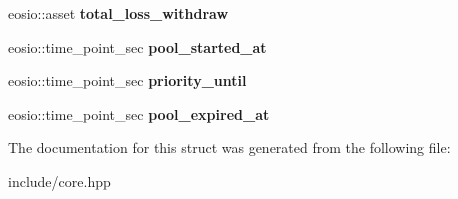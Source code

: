 \begin{DoxyCompactItemize}
eosio\+::asset {\bfseries total\+\_\+loss\+\_\+withdraw}
\item 
\mbox{\label{structeosio_1_1pool_a9432bde44a38b416c5317c488805523f}} 
eosio\+::time\+\_\+point\+\_\+sec {\bfseries pool\+\_\+started\+\_\+at}
\item 
\mbox{\label{structeosio_1_1pool_a59787660890e4bda98e981b882a77f4e}} 
eosio\+::time\+\_\+point\+\_\+sec {\bfseries priority\+\_\+until}
\item 
\mbox{\label{structeosio_1_1pool_a3f19a2b1d326449883b229082206b66c}} 
eosio\+::time\+\_\+point\+\_\+sec {\bfseries pool\+\_\+expired\+\_\+at}
\end{DoxyCompactItemize}


The documentation for this struct was generated from the following file\+:\begin{DoxyCompactItemize}
\item 
include/core.\+hpp\end{DoxyCompactItemize}
